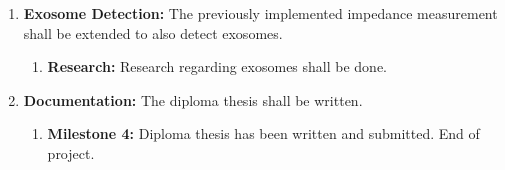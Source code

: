 \begin{enumerate}
\item \textbf{Exosome Detection:} The previously implemented impedance measurement shall be extended to also detect exosomes.
    \begin{enumerate}
        \item \textbf{Research:} Research regarding exosomes shall be done.
    \end{enumerate}
\item \textbf{Documentation:} The diploma thesis shall be written.
    \begin{enumerate}
        \item \textbf{Milestone 4:} Diploma thesis has been written and submitted. End of project.
    \end{enumerate}
\end{enumerate}
 
